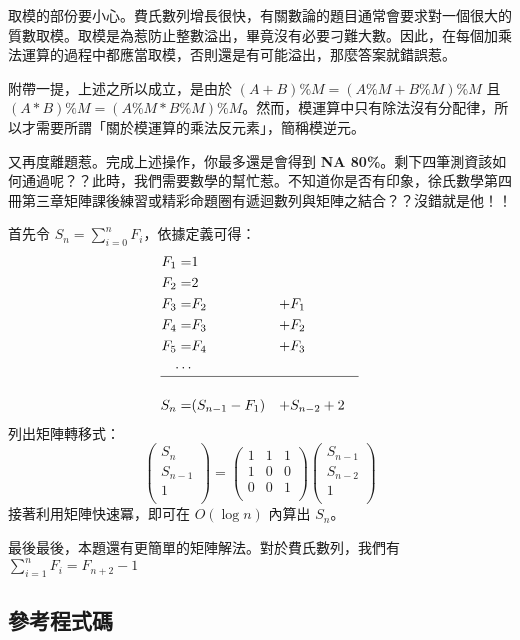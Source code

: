 \documentclass[a4paper,10pt]{article}
\begin{document}
取模的部份要小心。費氏數列增長很快，有關數論的題目通常會要求對一個很大的質數取模。取模是為惹防止整數溢出，畢竟沒有必要刁難大數。因此，在每個加乘法運算的過程中都應當取模，否則還是有可能溢出，那麼答案就錯誤惹。

附帶一提，上述之所以成立，是由於 $(A + B) \% M = (A \% M + B \% M) \% M$ 且 $(A * B) \% M = (A \% M * B \% M) \% M$。然而，模運算中只有除法沒有分配律，所以才需要所謂「關於模運算的乘法反元素」，簡稱模逆元。

又再度離題惹。完成上述操作，你最多還是會得到 \textbf{NA 80\%}。剩下四筆測資該如何通過呢？？此時，我們需要數學的幫忙惹。不知道你是否有印象，徐氏數學第四冊第三章矩陣課後練習或精彩命題圈有遞迴數列與矩陣之結合？？沒錯就是他！！

首先令 $S_n = \sum_{i=0}^{n}{F_i}$，依據定義可得：$$\begin{aligned}
F_1 = & 1 \\
F_2 = & 2 \\
F_3 = & F_2 & + & F_1 \\
F_4 = & F_3 & + & F_2 \\
F_5 = & F_4 & + & F_3 \\
\cdots \\
\hline \\
S_n = & (S_{n-1} - F_1) & + & S_{n - 2} + 2
\end{aligned}$$
列出矩陣轉移式：$$
\left(\begin{array}{c}
       S_n \\
       S_{n-1} \\
       1 \\
      \end{array}
\right)
= \left(\begin{array}{ccc}
       1 & 1 & 1 \\
       1 & 0 & 0 \\
       0 & 0 & 1 \\
      \end{array}
\right)
\left(\begin{array}{c}
       S_{n-1} \\
       S_{n-2} \\
       1 \\
      \end{array}
\right)
$$
接著利用矩陣快速冪，即可在 $O(\log n)$ 內算出 $S_n$。

最後最後，本題還有更簡單的矩陣解法。對於費氏數列，我們有 $\sum_{i=1}^{n}{F_i} = F_{n+2} - 1$

\subsection{參考程式碼}
\end{document}
